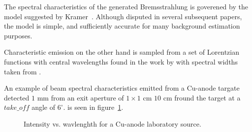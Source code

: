 The spectral characteristics of the generated Bremsstrahlung is goverened by
the model suggested by Kramer~\cite{kramer_23}. Although disputed in several
subsequent papers, the model is simple, and sufficiently accurate for many
background estimation purposes.

Characteristic emission on the other hand is sampled from a set of Lorentzian
functions with central wavelengths found in the work by \cite{bearden} with
spectral widths taken from \cite{deutsch}.

An example of beam spectral characteristics emitted from a Cu-anode targate detected $1$ mm  from an exit aperture of $1\times 1$ cm $10$ cm fround the target at a $take\_off$ angle of $6^\circ$. is seen in figure~\ref{f:source_lab_spectrum}.
\begin{figure}
\label{f:source_lab_spectrum}
\caption{Intensity vs. wavlenghth for a Cu-anode laboratory source.}
\end{figure}
